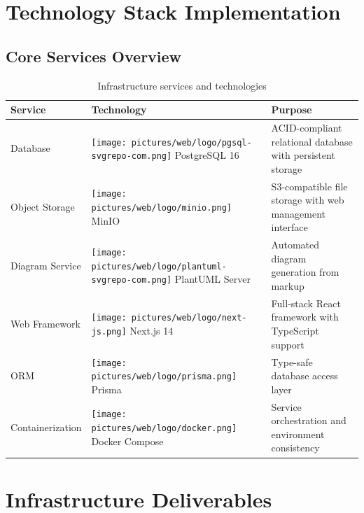 \section{Technology Stack Implementation}

\subsection{Core Services Overview}

\begin{table}[h!]
    \centering
    \begin{tabular}{|p{3cm}|p{4cm}|p{6cm}|}
        \hline
        \textbf{Service} & \textbf{Technology} & \textbf{Purpose} \\ \hline
        
        Database &\texttt{[image: pictures/web/logo/pgsql-svgrepo-com.png]}  PostgreSQL 16 & ACID-compliant relational database with persistent storage \\ \hline
        
        Object Storage & \texttt{[image: pictures/web/logo/minio.png]}  MinIO & S3-compatible file storage with web management interface \\ \hline
        
        Diagram Service & \texttt{[image: pictures/web/logo/plantuml-svgrepo-com.png]}  PlantUML Server & Automated diagram generation from markup \\ \hline
        
        Web Framework & \texttt{[image: pictures/web/logo/next-js.png]}  Next.js 14 & Full-stack React framework with TypeScript support \\ \hline
        
        ORM &\texttt{[image: pictures/web/logo/prisma.png]}  Prisma & Type-safe database access layer \\ \hline
        
        Containerization & \texttt{[image: pictures/web/logo/docker.png]}  Docker Compose & Service orchestration and environment consistency \\ \hline
    \end{tabular}
    \caption{Infrastructure services and technologies}
\end{table}

\section{Infrastructure Deliverables}


